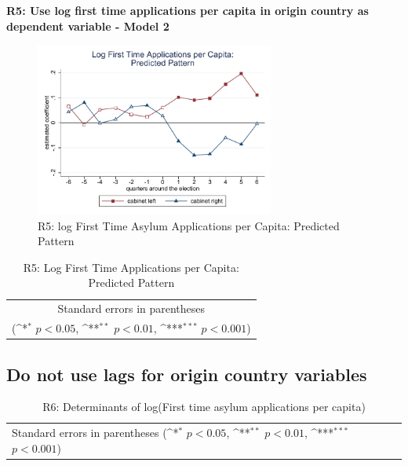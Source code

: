 \documentclass[10pt,a4paper]{scrartcl}
\begin{document}
\clearpage
\textbf{R5: Use log first time applications per capita in origin country as dependent variable - Model 2}
\begin{figure}[!ht]
	\centering
	\includegraphics[width=0.7\textwidth]{figures_edited/app_graph2_R5.pdf}
	\caption{R5: log First Time Asylum Applications per Capita: Predicted Pattern}
\end{figure}

\begin{table}[!ht]\centering
	\footnotesize
	\renewcommand{\arraystretch}{1.2}
	\def\sym#1{\ifmmode^{#1}\else\(^{#1}\)\fi}
	\caption{R5: Log First Time Applications per Capita: Predicted Pattern}
	\begin{tabular}{l*{2}{c}}
		\hline\hline
		
		\hline\hline
		\multicolumn{3}{c}{\footnotesize Standard errors in parentheses} \\
		\multicolumn{3}{c}{\footnotesize (\sym{*} \(p<0.05\), \sym{**} \(p<0.01\), \sym{***} \(p<0.001\))} \\
	\end{tabular}
\end{table}





\clearpage
\FloatBarrier
\subsection{Do not use lags for origin country variables}
\begin{table}[!ht]\centering
	\renewcommand{\arraystretch}{1.25}
	\small
	\def\sym#1{\ifmmode^{#1}\else\(^{#1}\)\fi}
	\caption{R6: Determinants of log(First time asylum applications per capita)}
	\begin{tabular}{l*{3}{c}}
		\hline\hline
		
		\hline\hline
		\multicolumn{4}{l}{\footnotesize Standard errors in parentheses (\sym{*} \(p<0.05\), \sym{**} \(p<0.01\), \sym{***} \(p<0.001\))}\\
	\end{tabular}
\end{table}
\end{document}
